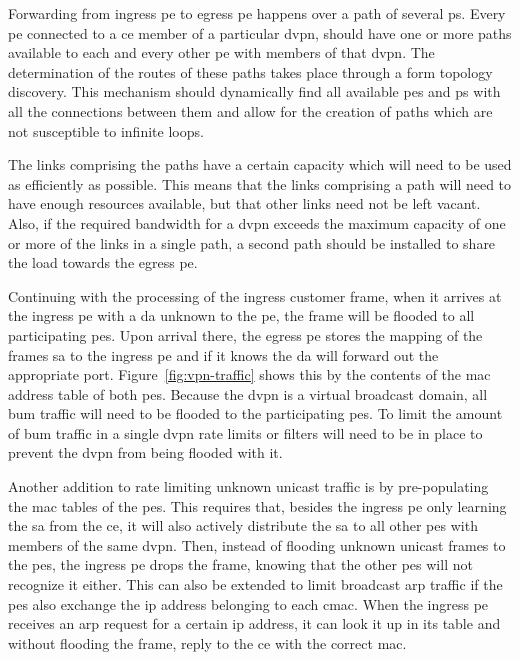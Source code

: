 Forwarding from ingress \ac{pe} to egress \ac{pe} happens over a path of several \acp{p}. Every \ac{pe} connected to a \ac{ce} member of a particular \ac{dvpn}, should have one or more paths available to each and every other \ac{pe} with members of that \ac{dvpn}. The determination of the routes of these paths takes place through a form topology discovery. This mechanism should dynamically find all available \acp{pe} and \acp{p} with all the connections between them and allow for the creation of paths which are not susceptible to infinite loops.

The links comprising the paths have a certain capacity which will need to be used as efficiently as possible. This means that the links comprising a path will need to have enough resources available, but that other links need not be left vacant. Also, if the required bandwidth for a \ac{dvpn} exceeds the maximum capacity of one or more of the links in a single path, a second path should be installed to share the load towards the egress \ac{pe}. 

Continuing with the processing of the ingress customer frame, when it arrives at the ingress \ac{pe} with a \ac{da} unknown to the \ac{pe}, the frame will be flooded to all participating \acp{pe}. Upon arrival there, the egress \ac{pe} stores the mapping of the frames \ac{sa} to the ingress \ac{pe} and if it knows the \ac{da} will forward out the appropriate port. Figure~\ref{fig:vpn-traffic} shows this by the contents of the \ac{mac} address table of both \acp{pe}. Because the \ac{dvpn} is a virtual broadcast domain, all \ac{bum} traffic will need to be flooded to the participating \acp{pe}. To limit the amount of \ac{bum} traffic in a single \ac{dvpn} rate limits or filters will need to be in place to prevent the \ac{dvpn} from being flooded with it.

Another addition to rate limiting unknown unicast traffic is by pre-populating the \acs{mac} tables of the \acp{pe}. This requires that, besides the ingress \ac{pe} only learning the \ac{sa} from the \ac{ce}, it will also actively distribute the \ac{sa} to all other \acp{pe} with members of the same \ac{dvpn}. Then, instead of flooding unknown unicast frames to the \acp{pe}, the ingress \ac{pe} drops the frame, knowing that the other \acp{pe} will not recognize it either. This can also be extended to limit broadcast \ac{arp} traffic if the \acp{pe} also exchange the \ac{ip} address belonging to each \ac{cmac}. When the ingress \ac{pe} receives an \acs{arp} request for a certain \ac{ip} address, it can look it up in its table and without flooding the frame, reply to the \ac{ce} with the correct \ac{mac}.

